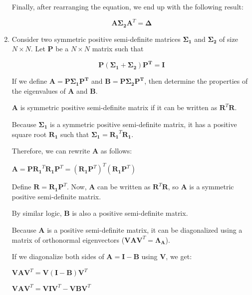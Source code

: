 \documentclass[fleqn]{article}
\begin{document}
\begin{enumerate}
		Finally, after rearranging the equation, we end up with the following result:
		
		\begin{equation*}
			\mathbf{A}\mathbf{\Sigma_2}\mathbf{A}^T = \mathbf{\Delta}
		\end{equation*}
		
		\item Consider two symmetric positive semi-definite matrices $\mathbf{\Sigma_1}$ and $\mathbf{\Sigma_2}$ of size $N \times N$. Let $\mathbf{P}$ be a $N \times N$ matrix such that
		
		\begin{equation*}
			\mathbf{P}(\mathbf{\Sigma_1} + \mathbf{\Sigma_2})\mathbf{P^T} = \mathbf{I}
		\end{equation*}
		
		If we define $\mathbf{A} = \mathbf{P}\mathbf{\Sigma_1}\mathbf{P^T}$ and $\mathbf{B} = \mathbf{P}\mathbf{\Sigma_2}\mathbf{P^T}$, then determine the properties of the eigenvalues of $\mathbf{A}$ and $\mathbf{B}$.
		
		$\mathbf{A}$ is symmetric positive semi-definite matrix if it can be written as $\mathbf{R}^T\mathbf{R}$.
		
		Because $\mathbf{\Sigma_1}$ is a symmetric positive semi-definite matrix, it has a positive square root $\mathbf{R_1}$ such that $\mathbf{\Sigma_1} = \mathbf{R_1}^T\mathbf{R_1}$.
		
		Therefore, we can rewrite $\mathbf{A}$ as follows:
		
		$\mathbf{A} = \mathbf{P}\mathbf{R_1}^T\mathbf{R_1}\mathbf{P}^T = (\mathbf{R_1}\mathbf{P}^T)^T(\mathbf{R_1}\mathbf{P}^T)$

		Define $\mathbf{R} = \mathbf{R_1}\mathbf{P}^T$. Now, $\mathbf{A}$ can be written as $\mathbf{R}^T\mathbf{R}$, so $\mathbf{A}$ is a symmetric positive semi-definite matrix.
		
		By similar logic, $\mathbf{B}$ is also a positive semi-definite matrix.
		
		Because $\mathbf{A}$ is a positive semi-definite matrix, it can be diagonalized using a matrix of orthonormal eigenvectors ($\mathbf{V}\mathbf{A}\mathbf{V}^T = \mathbf{\Lambda_A}$).
		
		If we diagonalize both sides of $\mathbf{A} = \mathbf{I} - \mathbf{B}$ using $\mathbf{V}$, we get:
		
		$\mathbf{V}\mathbf{A}\mathbf{V}^T = \mathbf{V}(\mathbf{I} - \mathbf{B})\mathbf{V}^T$
		
		$\mathbf{V}\mathbf{A}\mathbf{V}^T = \mathbf{V}\mathbf{I}\mathbf{V}^T - \mathbf{V}\mathbf{B}\mathbf{V}^T$
		

\end{enumerate}
\end{document}
